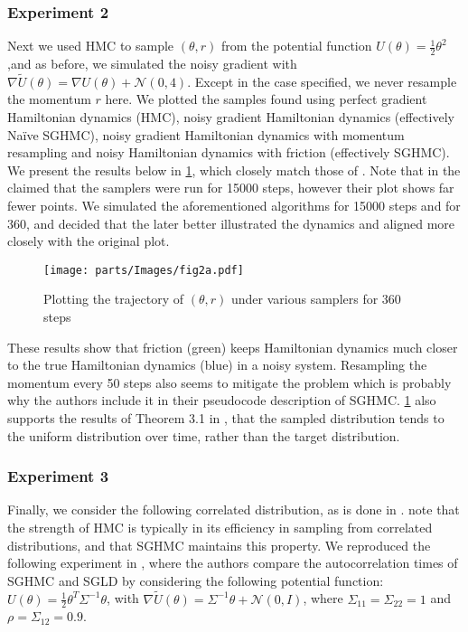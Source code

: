 \subsubsection*{Experiment 2}
Next we used HMC to sample $(\theta, r)$ from the potential function $U(\theta) = \frac{1}{2}\theta^2$ ,and as before, we simulated the noisy gradient with $\nabla \widetilde{U}(\theta) = \nabla U(\theta) + \mathcal{N}(0,4)$. Except in the case specified, we never resample the momentum $r$ here. We plotted the samples found using perfect gradient Hamiltonian dynamics (HMC), noisy gradient Hamiltonian dynamics (effectively Naïve SGHMC), noisy gradient Hamiltonian dynamics with momentum resampling and noisy Hamiltonian dynamics with friction (effectively SGHMC). We present the results below in \cref{fig:theta_r_samples}, which closely match those of \cite{sghmc}. Note that in \cite{sghmc} the \citeauthor{sghmc} claimed that the samplers were run for 15000 steps, however their plot shows far fewer points. We simulated the aforementioned algorithms for 15000 steps and for 360, and decided that the later better illustrated the dynamics and aligned more closely with the original plot.
\begin{figure}[h!]
    \centering
    \texttt{[image: parts/Images/fig2a.pdf]}%
    \caption{Plotting the trajectory of $(\theta, r)$ under various samplers for 360 steps}
     \label{fig:theta_r_samples}%
\end{figure}
These results show that friction (green) keeps Hamiltonian dynamics much closer to the true Hamiltonian dynamics (blue) in a noisy system. Resampling the momentum every 50 steps also seems to mitigate the problem which is probably why the authors \citeauthor{sghmc} include it in their pseudocode description of SGHMC. \cref{fig:theta_r_samples} also supports the results of Theorem 3.1 in \cite{sghmc}, that the sampled distribution tends to the uniform distribution over time, rather than the target distribution.
\subsubsection*{Experiment 3}
Finally, we consider the following correlated distribution, as is done in \cite{sghmc}. \citeauthor{sghmc} note that the strength of HMC is typically in its efficiency in sampling from correlated distributions, and that SGHMC maintains this property. We reproduced the following experiment in \cite{sghmc}, where the authors \citeauthor{sghmc} compare the autocorrelation times of SGHMC and SGLD by considering the following potential function: $U(\theta)=\frac{1}{2}\theta^T\Sigma^{-1}\theta$, with $\nabla \widetilde{U}(\theta) = \Sigma^{-1}\theta + \mathcal{N}(0,I)$, where $\Sigma_{11} = \Sigma_{22} = 1$ and $\rho = \Sigma_{12} = 0.9$.  

